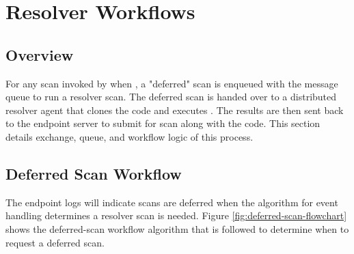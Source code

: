 \chapter{Resolver Workflows}\label{sec:resolver-workflows}

\section{Overview}
For any scan invoked by \cxoneflow\space when , 
a "deferred" scan is enqueued with the message queue to run a resolver scan.  The deferred scan is handed over
to a distributed resolver agent that clones the code and executes \scaresolver.  The \scaresolver results are
then sent back to the \cxoneflow endpoint server to submit for scan along with the code.  This section details
exchange, queue, and workflow logic of this process.


\section{Deferred Scan Workflow}

The \cxoneflow endpoint logs will indicate scans are deferred when the algorithm for event handling
determines a resolver scan is needed.  Figure \ref{fig:deferred-scan-flowchart} shows the deferred-scan
workflow algorithm that is followed to determine when to request a deferred scan.  

